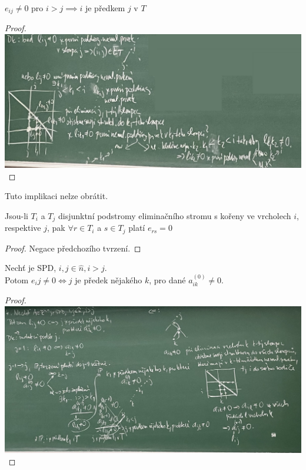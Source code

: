 \documentclass[../main.tex]{subfiles}
\begin{document}
\begin{claim}
$e_{ij}\neq 0$ pro $i>j \implies i$ je předkem $j$ v $T$
\end{claim}
\begin{proof}
    \hphantom{text}

        \includegraphics[width=0.9\linewidth]{images/19-10-dukaz2.jpg}
\end{proof}

\begin{remark}
    Tuto implikaci nelze obrátit.
\end{remark}
\begin{claim}
Jsou-li $T_i$ a $T_j$ disjunktní podstromy eliminačního stromu s kořeny ve vrcholech $i$, respektive $j$,
pak $\forall r \in T_i$ a $s\in T_j$ platí $e_{rs} = 0$
\end{claim}
\begin{proof}
    Negace předchozího tvrzení. 
\end{proof}


\begin{claim}
    Nechť \matAsquare je SPD, $i,j\in\hat{n}, i>j$.\\
    Potom $e_ij \neq 0 \Leftrightarrow j$ je předek 
    nějakého $k$, pro dané $a_{ik}^{(0)}\neq 0$.
\end{claim}
\begin{proof}
    \hphantom{text}

    \includegraphics[width=0.9\linewidth]{images/19-10-dukaz4.jpg}
\end{proof}
\end{document}
